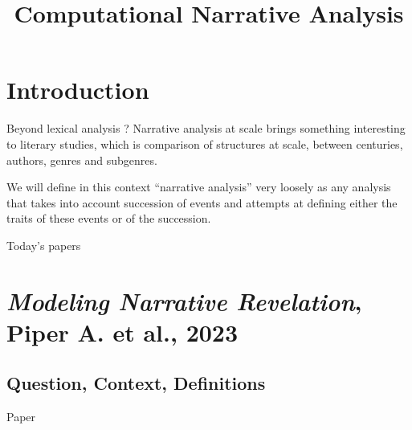 \documentclass[aspectratio=169]{beamer}
\title[Intro to CH]{Computational Narrative Analysis}
\begin{document}
\frame{\titlepage}

\section{Introduction}

\begin{frame}{Beyond lexical analysis ?}
    Narrative analysis at scale brings something interesting to literary studies, which is comparison of structures at scale, between centuries, authors, genres and subgenres.

    \vspace{2em}

    We will define in this context ``narrative analysis'' very loosely as any analysis that takes into account succession of events and attempts at defining either the traits of these events or of the succession. 
\end{frame}

\begin{frame}{Today's papers}

    \vspace{2em}
\end{frame}

\section{\textit{Modeling Narrative Revelation}, Piper A. et al., 2023}

\subsection{Question, Context, Definitions}

\begin{frame}{Paper}
\end{frame}
\end{document}
